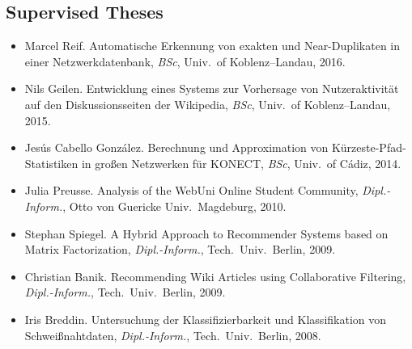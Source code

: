 \documentclass[line,mm]{res}
\newcounter{x}
\newcounter{y}
\begin{document}
\begin{resume}
\section{Supervised Theses}
\begin{itemize}
\item 
  Marcel Reif.  Automatische Erkennung von exakten und
  Near-Duplikaten in einer Netzwerkdatenbank, \emph{BSc}, Univ.\ of Koblenz--Landau, 2016.
\item 
  Nils Geilen.  Entwicklung eines Systems zur Vorhersage von
  Nutzeraktivität auf den Diskussionsseiten der Wikipedia,
  \emph{BSc}, Univ.\ of Koblenz--Landau, 2015.
\item
  Jesús Cabello González.  Berechnung und Approximation von
  Kürzeste-Pfad-Statistiken in großen Netzwerken für KONECT,
  \emph{BSc}, Univ.\ of Cádiz, 2014. 
\item
  Julia Preusse. Analysis of the WebUni Online Student Community,
  \emph{Dipl.-Inform.}, Otto von Guericke Univ.\ Magdeburg, 2010.  
\item
  Stephan Spiegel.  A Hybrid Approach to Recommender Systems based
  on Matrix Factorization, \emph{Dipl.-Inform.}, Tech.\ Univ.\ Berlin, 2009.  
\item
  Christian Banik.  Recommending Wiki Articles using Collaborative
  Filtering, \emph{Dipl.-Inform.}, Tech.\ Univ.\ Berlin, 2009. 
\item
  Iris Breddin.  Untersuchung der Klassifizierbarkeit und
  Klassifikation von Schweißnahtdaten, \emph{Dipl.-Inform.}, Tech.\ Univ.\ Berlin, 2008.
\end{itemize}


\end{resume}
\end{document}
